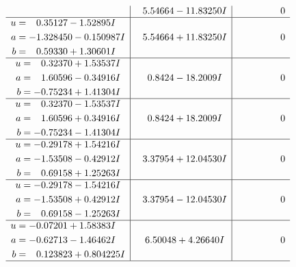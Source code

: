 \documentclass[1p]{elsarticle_modified}
\theoremstyle{definition}
\begin{document}
$$\begin{array}{c|c|c}
 & \phantom{-}5.54664 - 11.83250 I & \phantom{-0.000000 } 0 \\ \hline\begin{aligned}
u &= \phantom{-}0.35127 - 1.52895 I \\
a &= -1.328450 - 0.150987 I \\
b &= \phantom{-}0.59330 + 1.30601 I\end{aligned}
 & \phantom{-}5.54664 + 11.83250 I & \phantom{-0.000000 } 0 \\ \hline\begin{aligned}
u &= \phantom{-}0.32370 + 1.53537 I \\
a &= \phantom{-}1.60596 - 0.34916 I \\
b &= -0.75234 + 1.41304 I\end{aligned}
 & \phantom{-}0.8424 - 18.2009 I & \phantom{-0.000000 } 0 \\ \hline\begin{aligned}
u &= \phantom{-}0.32370 - 1.53537 I \\
a &= \phantom{-}1.60596 + 0.34916 I \\
b &= -0.75234 - 1.41304 I\end{aligned}
 & \phantom{-}0.8424 + 18.2009 I & \phantom{-0.000000 } 0 \\ \hline\begin{aligned}
u &= -0.29178 + 1.54216 I \\
a &= -1.53508 - 0.42912 I \\
b &= \phantom{-}0.69158 + 1.25263 I\end{aligned}
 & \phantom{-}3.37954 + 12.04530 I & \phantom{-0.000000 } 0 \\ \hline\begin{aligned}
u &= -0.29178 - 1.54216 I \\
a &= -1.53508 + 0.42912 I \\
b &= \phantom{-}0.69158 - 1.25263 I\end{aligned}
 & \phantom{-}3.37954 - 12.04530 I & \phantom{-0.000000 } 0 \\ \hline\begin{aligned}
u &= -0.07201 + 1.58383 I \\
a &= -0.62713 - 1.46462 I \\
b &= \phantom{-}0.123823 + 0.804225 I\end{aligned}
 & \phantom{-}6.50048 + 4.26640 I & \phantom{-0.000000 } 0\\
 \hline 
 \end{array}$$\newpage$$\begin{array}{c|c|c}  

\end{array}$$
\end{document}
